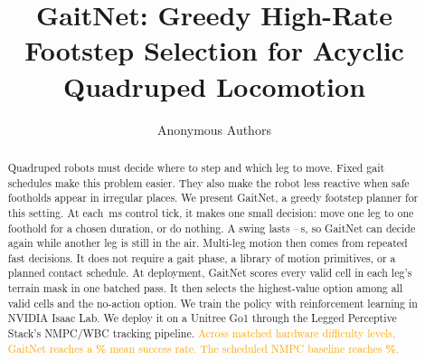 \documentclass[conference]{IEEEtran}
\newcommand{\pending}[1]{\textcolor{orange}{#1}}
\begin{document}
\title{GaitNet: Greedy High-Rate Footstep Selection for Acyclic
  Quadruped Locomotion}

\author{Anonymous Authors}


\maketitle

\begin{abstract}
  Quadruped robots must decide where to step and which leg to move.
  Fixed gait schedules make this problem easier. They also make the
  robot less reactive when safe footholds appear in irregular places.
  We present GaitNet, a greedy footstep planner for this setting. At
  each \corlControlTickMs\,ms control tick, it makes one small
  decision: move one leg to one foothold for a chosen duration, or do
  nothing. A swing lasts
  \corlSwingDurationMin--\corlSwingDurationMax\,s, so GaitNet can
  decide again while another leg is still in the air. Multi-leg
  motion then comes from repeated fast decisions. It does not require
  a gait phase, a library of motion primitives, or a planned contact
  schedule. At deployment, GaitNet scores every valid cell in
  each leg's terrain mask in one batched pass. It then selects the
  highest-value option among all valid cells and the no-action
  option. We train the policy with reinforcement learning in NVIDIA
  Isaac Lab. We deploy it on a Unitree Go1 through the Legged
  Perceptive Stack's NMPC/WBC tracking pipeline. \pending{Across
  matched hardware difficulty levels, GaitNet reaches a
  \textbf{\corlHwFullSuccess\%} mean success rate. The scheduled NMPC
  baseline reaches \textbf{\corlHwLPSSuccess\%}.}
\end{abstract}
\end{document}
